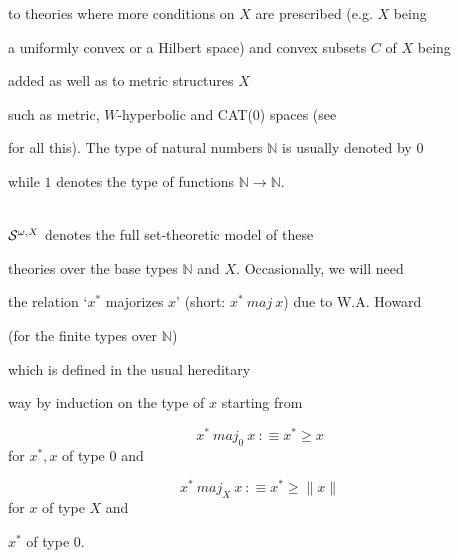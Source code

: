 \documentclass[1p]{elsarticle}
\newcommand{\NN}{\ensuremath{\mathbb{N}}}
\theoremstyle{plain}
\theoremstyle{definition}
\theoremstyle{remark}
\theoremstyle{definition}
\begin{document}
to theories where more conditions on $X$ are prescribed (e.g. $X$ being 

a uniformly convex or a Hilbert space) and convex subsets $C$ of $X$ being 

added as well as to metric structures $X$ 

such as metric, $W$-hyperbolic and CAT(0) spaces (see \cite{Kohlenbach(book)} 

for all this). The type of natural numbers $\NN$ is usually denoted by $0$ 

while $1$ denotes the type of functions $\NN\to\NN.$

\\[1mm] ${\cal S}^{\omega,X}$ denotes the full set-theoretic model of these 

theories over the base types $\NN$ and $X.$ Occasionally, we will need 

the relation `$x^*$ majorizes $x$' (short: $x^* \ maj \ x$) due to W.A. Howard 

(for the finite types over $\NN$)  

which is defined in the usual hereditary 

way by induction on the type of $x$ starting from 

\[ x^* \ maj_0 \ x\ :\equiv x^*\ge x \] for $x^*,x$ of type $0$ and 

\[ x^* \ maj_X \ x\ :\equiv x^* \ge \| x\|\] for $x$ of type $X$ and 

$x^*$ of type $0.$ 
\end{document}

